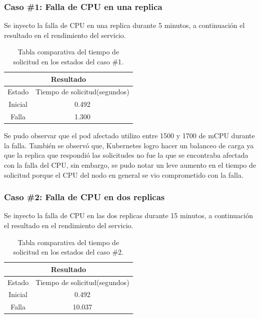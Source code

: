 \subsubsection{Caso \#1: Falla de CPU en una replica}


\par Se inyecto la falla de CPU en una replica durante 5 minutos, a continuación el resultado en el rendimiento del servicio.\\

\begin{table}[ht!]
\begin{center}
\begin{tabular}{ |c|c| } 
 \hline
 \multicolumn{2}{|c|}{Resultado} \\
 \hline
 \hline
 Estado & Tiempo de solicitud(segundos)\\
 \hline
 Inicial & 0.492\\
 Falla & 1.300\\
 \hline
\end{tabular}
\end{center}
\caption{Tabla comparativa del tiempo de solicitud en los estados del caso \#1.}
\label{tab:tabla45}
\end{table}


\par Se pudo observar que el pod afectado utilizo entre 1500 y 1700 de mCPU durante la falla. También se observ\'o que, Kubernetes logro hacer un balanceo de carga ya que la replica que respondió las solicitudes no fue la que se encontraba afectada con la falla del CPU, sin embargo, se pudo notar un leve aumento en el tiempo de solicitud porque el CPU del nodo en general se vio comprometido con la falla.\\

\subsubsection{Caso \#2: Falla de CPU en dos replicas}

\par Se inyecto la falla de CPU en las dos replicas durante 15 minutos, a continuación el resultado en el rendimiento del servicio.\\

\begin{table}[ht!]
\begin{center}
\begin{tabular}{ |c|c| } 
 \hline
 \multicolumn{2}{|c|}{Resultado} \\
 \hline
 \hline
 Estado & Tiempo de solicitud(segundos)\\
 \hline
 Inicial & 0.492\\
 Falla & 10.037\\
 \hline
\end{tabular}
\end{center}
\caption{Tabla comparativa del tiempo de solicitud en los estados del caso \#2.}
\label{tab:tabla46}
\end{table}

